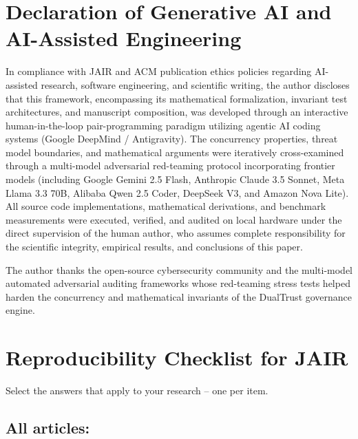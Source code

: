 \documentclass[manuscript, screen, review]{jair}
\begin{document}
\section*{Declaration of Generative AI and AI-Assisted Engineering}
In compliance with JAIR and ACM publication ethics policies regarding AI-assisted research, software engineering, and scientific writing, the author discloses that this framework, encompassing its mathematical formalization, invariant test architectures, and manuscript composition, was developed through an interactive human-in-the-loop pair-programming paradigm utilizing agentic AI coding systems (Google DeepMind / Antigravity). The concurrency properties, threat model boundaries, and mathematical arguments were iteratively cross-examined through a multi-model adversarial red-teaming protocol incorporating frontier models (including Google Gemini 2.5 Flash, Anthropic Claude 3.5 Sonnet, Meta Llama 3.3 70B, Alibaba Qwen 2.5 Coder, DeepSeek V3, and Amazon Nova Lite). All source code implementations, mathematical derivations, and benchmark measurements were executed, verified, and audited on local hardware under the direct supervision of the human author, who assumes complete responsibility for the scientific integrity, empirical results, and conclusions of this paper.

\begin{acks}
The author thanks the open-source cybersecurity community and the multi-model automated adversarial auditing frameworks whose red-teaming stress tests helped harden the concurrency and mathematical invariants of the DualTrust governance engine.
\end{acks}

\printbibliography

\appendix

\section{Reproducibility Checklist for JAIR}

Select the answers that apply to your research -- one per item. 

\subsection*{All articles:}
\end{document}
